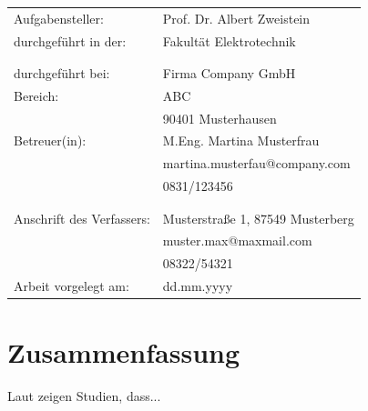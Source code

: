 \documentclass[11pt, a4paper]{article}
\begin{document}
\begin{titlepage}
\begin{center}
\begin{minipage}{\textwidth}
            \begin{minipage}{0.4\textwidth}
                \raggedleft
                \small
                \begin{tabular}{l l}
                    Aufgabensteller: & Prof. Dr. Albert Zweistein \\
                    durchgeführt in der: & Fakultät Elektrotechnik \\
			&\\
			&\\
                    durchgeführt bei: & Firma Company GmbH \\
                    Bereich: & ABC \\
                    &90401 Musterhausen \\
                    Betreuer(in): & M.Eng. Martina Musterfrau \\
                    &martina.musterfau@company.com \\
                    &0831/123456 \\
		&\\
		&\\
                    Anschrift des Verfassers: & Musterstraße 1, 87549 Musterberg \\
                    &muster.max@maxmail.com \\
                    &08322/54321 \\
                    Arbeit vorgelegt am: & dd.mm.yyyy \\
                \end{tabular}
            \end{minipage}
        \end{minipage}

        \vspace*{\fill} %
    \end{center}
\end{titlepage}




\restoregeometry %


\section*{Zusammenfassung}
\lipsum[1-3] %
Laut \cite{example} zeigen Studien, dass...
\end{document}
